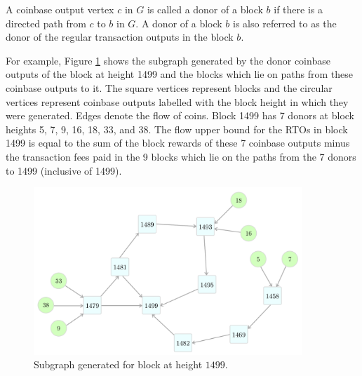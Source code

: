 \begin{definition}
  A coinbase output vertex $c$ in $G$ is called a donor of a block $b$ if there is a directed path from $c$ to $b$ in $G$. A donor of a block $b$ is also referred to as the donor of the regular transaction outputs in the block $b$.
\end{definition}
For example, Figure \ref{subgraph-eg} shows the subgraph generated by the donor coinbase outputs of the block at height 1499 and the blocks which lie on paths from these coinbase outputs to it. 
The square vertices represent blocks and the circular vertices represent coinbase outputs labelled with the block height in which they were generated. Edges denote the flow of coins.
Block 1499 has 7 donors at block heights 5, 7, 9, 16, 18, 33, and 38. The flow upper bound for the RTOs in block 1499 is equal to the sum of the block rewards of these 7 coinbase outputs minus the transaction fees paid in the 9 blocks which lie on the paths from the 7 donors to 1499 (inclusive of 1499).
\begin{figure}[!t]
  \centering
  \includegraphics[width=0.9\textwidth]{Figures/subgraph1499.pdf}
  \caption{Subgraph generated for block at height $1499$.}
  \label{subgraph-eg}
\end{figure}


